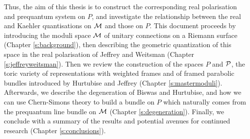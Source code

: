 	Thus, the aim of this thesis is to construct the corresponding real polarisation and prequantum system on $P$, and investigate the relationship between the real and Kaehler quantisations on $\mathcal{M}$ and those on $P$. This document proceeds by introducing the moduli space $\mathcal{M}$ of unitary connections on a Riemann surface  (Chapter \ref{s:background}), then describing the geometric quantization of this space in the real polarisation of Jeffrey and Weitsman (Chapter \ref{s:jeffreyweitsman}). Then we review the construction of the spaces $P$ and $\mathcal{P}$, the toric variety of representations with weighted frames and of framed parabolic bundles introduced by Hurtubise and Jeffrey (Chapter \ref{s:mastermoduli}). Afterwards, we describe the degeneration of Biswas and Hurtubise, and how we can use Chern-Simons theory to build a bundle on $P$ which naturally comes from the prequantum line bundle on $\mathcal{M}$ (Chapter \ref{s:degeneration}). Finally, we conclude with a summary of the results and potential avenues for continued research (Chapter \ref{s:conclusions}).

